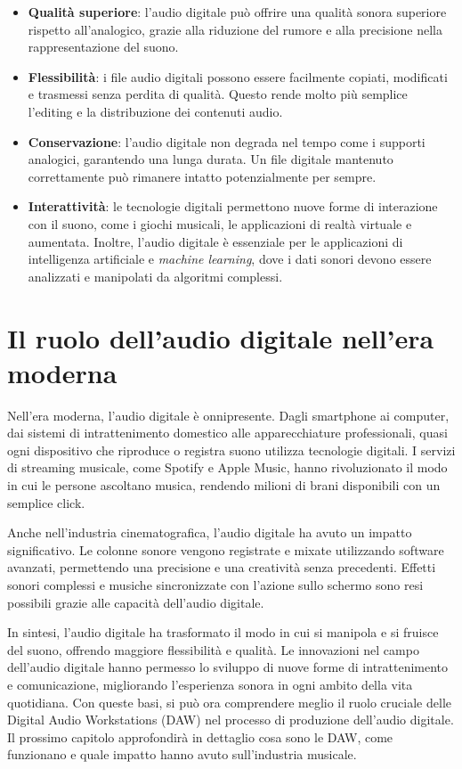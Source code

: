 \documentclass{book}
\begin{document}
\begin{itemize}
\item \textbf{Qualità superiore}: l’audio digitale può offrire una qualità sonora superiore rispetto all’analogico, grazie alla riduzione del rumore e alla precisione nella rappresentazione del suono.
\item \textbf{Flessibilità}: i file audio digitali possono essere facilmente copiati, modificati e trasmessi senza perdita di qualità. Questo rende molto più semplice l’editing e la distribuzione dei contenuti audio.
\item \textbf{Conservazione}: l’audio digitale non degrada nel tempo come i supporti analogici, garantendo una lunga durata. Un file digitale mantenuto correttamente può rimanere intatto potenzialmente per sempre.
\item \textbf{Interattività}: le tecnologie digitali permettono nuove forme di interazione con il suono, come i giochi musicali, le applicazioni di realtà virtuale e aumentata. Inoltre, l’audio digitale è essenziale per le applicazioni di intelligenza artificiale e \emph{machine learning}, dove i dati sonori devono essere analizzati e manipolati da algoritmi complessi.
\end{itemize}

\section{Il ruolo dell’audio digitale nell’era moderna}

Nell’era moderna, l’audio digitale è onnipresente. Dagli smartphone ai computer, dai sistemi di intrattenimento domestico alle apparecchiature professionali, quasi ogni dispositivo che riproduce o registra suono utilizza tecnologie digitali. I servizi di streaming musicale, come Spotify e Apple Music, hanno rivoluzionato il modo in cui le persone ascoltano musica, rendendo milioni di brani disponibili con un semplice click.

Anche nell’industria cinematografica, l’audio digitale ha avuto un impatto significativo. Le colonne sonore vengono registrate e mixate utilizzando software avanzati, permettendo una precisione e una creatività senza precedenti. Effetti sonori complessi e musiche sincronizzate con l’azione sullo schermo sono resi possibili grazie alle capacità dell’audio digitale.

In sintesi, l’audio digitale ha trasformato il modo in cui si manipola e si fruisce del suono, offrendo maggiore flessibilità e qualità. Le innovazioni nel campo dell’audio digitale hanno permesso lo sviluppo di nuove forme di intrattenimento e comunicazione, migliorando l’esperienza sonora in ogni ambito della vita quotidiana. Con queste basi, si può ora comprendere meglio il ruolo cruciale delle Digital Audio Workstations (DAW) nel processo di produzione dell’audio digitale. Il prossimo capitolo approfondirà in dettaglio cosa sono le DAW, come funzionano e quale impatto hanno avuto sull’industria musicale.
\end{document}
